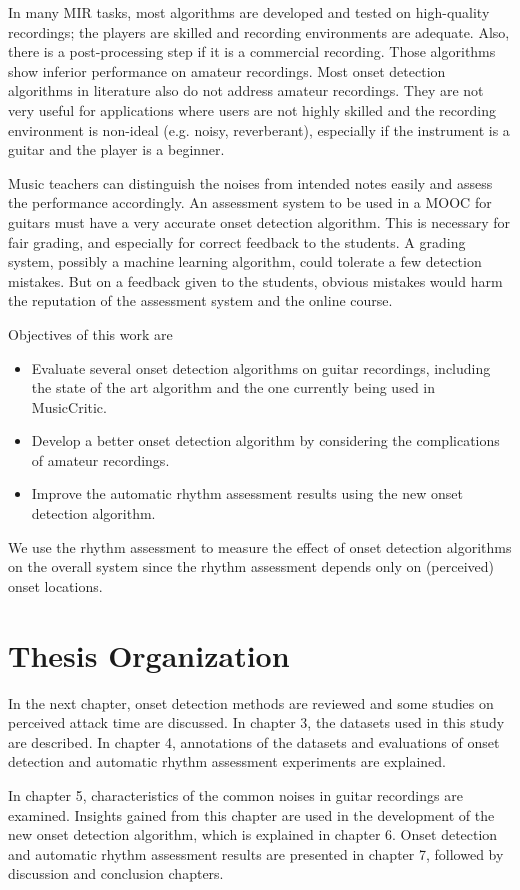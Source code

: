 In many MIR tasks, most algorithms are developed and tested on high-quality recordings; the players are skilled and recording environments are adequate. Also, there is a post-processing step if it is a commercial recording. Those algorithms show inferior performance on amateur recordings. Most onset detection algorithms in literature also do not address amateur recordings. They are not very useful for applications where users are not highly skilled and the recording environment is non-ideal (e.g. noisy, reverberant), especially if the instrument is a guitar and the player is a beginner. 

Music teachers can distinguish the noises from intended notes easily and assess the performance accordingly. An assessment system to be used in a MOOC for guitars must have a very accurate onset detection algorithm. This is necessary for fair grading, and especially for correct feedback to the students. A grading system, possibly a machine learning algorithm, could tolerate a few detection mistakes. But on a feedback given to the students, obvious mistakes would harm the reputation of the assessment system and the online course.

Objectives of this work are

\begin{itemize}
  \item Evaluate several onset detection algorithms on guitar recordings, including the state of the art algorithm and the one currently being used in MusicCritic.
  \item Develop a better onset detection algorithm by considering the complications of amateur recordings.
  \item Improve the automatic rhythm assessment results using the new onset detection algorithm.
\end{itemize}

We use the rhythm assessment to measure the effect of onset detection algorithms on the overall system since the rhythm assessment depends only on (perceived) onset locations. 

\section{Thesis Organization}

In the next chapter, onset detection methods are reviewed and some studies on perceived attack time are discussed. In chapter 3, the datasets used in this study are described. In chapter 4, annotations of the datasets and evaluations of onset detection and automatic rhythm assessment experiments are explained.

In chapter 5, characteristics of the common noises in guitar recordings are examined. Insights gained from this chapter are used in the development of the new onset detection algorithm, which is explained in chapter 6. Onset detection and automatic rhythm assessment results are presented in chapter 7, followed by discussion and conclusion chapters.

\newpage


